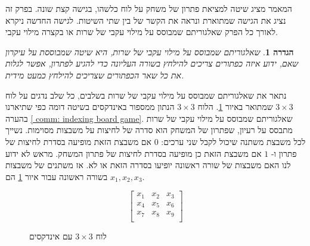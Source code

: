 \documentclass[12pt,leqno]{article}
\theoremstyle{theoremdd}
\newtheorem{definition}{הגדרה}
\begin{document}
המאמר 
\cite{B1}
מציג שיטה למציאת פתרון
של משחק על לוח כלשהו,
בגישה קצת שונה.
בפרק זה נציג את הגישה שמתוארת 
\cite{B1}
ונראה את הקשר של בין שתי השיטות.
לגישה החדשה ניקרא לאורך כל הפרק שאלגוריתם שמבוסס על מילוי עקבי של שרות
או בקצרה מילוי עקבי.
\begin{definition}
    \label{def: spanish way}
    שאלגוריתם שמבוסס על מילוי עקבי של שרות, היא שיטה שמבוססת על עיקרון 
    שאם, ידוע איזה כפתורים צריכים להילחץ בשורה העליונה כדי להגיע לפתרון, אפשר לגלות את כל שאר הכפתורים שצריכים להילחץ 
    כמעט מידית.
\end{definition}
נתאר את 
שאלגוריתם שמבוסס על מילוי עקבי של שרות
בשלבים,
כל שלב נדגים
על לוח 
$3 \times 3$
שמתואר באיור 
\ref{fig: 3 x 3 board indexed}.
הלוח 
$3 \times 3$
הנתון ממספור באינדקסים 
בשיטה דומה כפי שתיארנו בהערה 
\ref{ comm: indexing board game}.
שאלגוריתם שמבוסס על מילוי עקבי של שרות
מתבסס על רעיון,
שפתרון של המשחק הוא סדרה של לחיצות על משבצות מסוימות. נשייך
 לכל משבצת משתנה שיכול לקבל שני ערכים: 
 $0$
  אם משבצת הזאת מופיעה בסדרת לחיצות של פתרון
 ו-
 $1$
 אם משבצת הזאת כן מופיעה בסדרת לחיצות של פתרון המשחק.
  מראש לא ידוע לנו
 האם משבצות של שורה ראשונה יופיעו בסדרה הזאת או לא. אז משתנים של משבצות בשורה ראשונה
 עבור
 איור 
 \ref{fig: 3 x 3 board indexed}
 הם
 $x_1, x_2, x_3$.

\begin{figure}[ht]
    \caption{לוח 
    $3 \times 3$
    עם אינדקסים}
    \label{fig: 3 x 3 board indexed}
    \centering
    \[\begin{bmatrix}
        x_1 & x_2 & x_3 \\
        x_4 & x_5 & x_6 \\
        x_7 & x_8 & x_9 \\
    \end{bmatrix}    
    \]
\end{figure}
\end{document}
